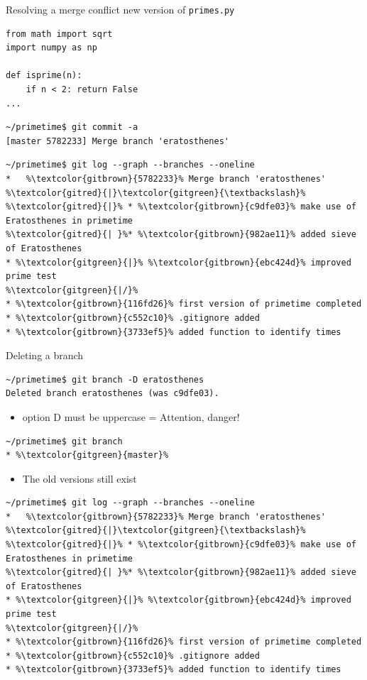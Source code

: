 \documentclass[svgnames]{beamer}
\begin{document}
\begin{frame}[fragile]{Resolving a merge conflict}
 new version of \texttt{primes.py}
 \begin{lstlisting}
from math import sqrt
import numpy as np

def isprime(n):
    if n < 2: return False
...
 \end{lstlisting}
 \begin{lstlisting}
~/primetime$ git commit -a
[master 5782233] Merge branch 'eratosthenes'
 \end{lstlisting}
 \begin{lstlisting}[escapechar=\%]
~/primetime$ git log --graph --branches --oneline
*   %\textcolor{gitbrown}{5782233}% Merge branch 'eratosthenes'
%\textcolor{gitred}{|}\textcolor{gitgreen}{\textbackslash}%  
%\textcolor{gitred}{|}% * %\textcolor{gitbrown}{c9dfe03}% make use of Eratosthenes in primetime
%\textcolor{gitred}{| }%* %\textcolor{gitbrown}{982ae11}% added sieve of Eratosthenes
* %\textcolor{gitgreen}{|}% %\textcolor{gitbrown}{ebc424d}% improved prime test
%\textcolor{gitgreen}{|/}%  
* %\textcolor{gitbrown}{116fd26}% first version of primetime completed
* %\textcolor{gitbrown}{c552c10}% .gitignore added
* %\textcolor{gitbrown}{3733ef5}% added function to identify times
 \end{lstlisting}
\end{frame}

\begin{frame}[fragile]{Deleting a branch}
 \begin{lstlisting}
~/primetime$ git branch -D eratosthenes
Deleted branch eratosthenes (was c9dfe03).
 \end{lstlisting}
 \begin{itemize}
  \item option D must be uppercase = \alert{Attention, danger!}
 \end{itemize}
 \begin{lstlisting}[escapechar=\%]
~/primetime$ git branch
* %\textcolor{gitgreen}{master}%
 \end{lstlisting}
 \begin{itemize}
  \item The old versions still exist
 \end{itemize}
 \begin{lstlisting}[escapechar=\%]
~/primetime$ git log --graph --branches --oneline
*   %\textcolor{gitbrown}{5782233}% Merge branch 'eratosthenes'
%\textcolor{gitred}{|}\textcolor{gitgreen}{\textbackslash}%  
%\textcolor{gitred}{|}% * %\textcolor{gitbrown}{c9dfe03}% make use of Eratosthenes in primetime
%\textcolor{gitred}{| }%* %\textcolor{gitbrown}{982ae11}% added sieve of Eratosthenes
* %\textcolor{gitgreen}{|}% %\textcolor{gitbrown}{ebc424d}% improved prime test
%\textcolor{gitgreen}{|/}%  
* %\textcolor{gitbrown}{116fd26}% first version of primetime completed
* %\textcolor{gitbrown}{c552c10}% .gitignore added
* %\textcolor{gitbrown}{3733ef5}% added function to identify times
 \end{lstlisting}
\end{frame}
\end{document}
